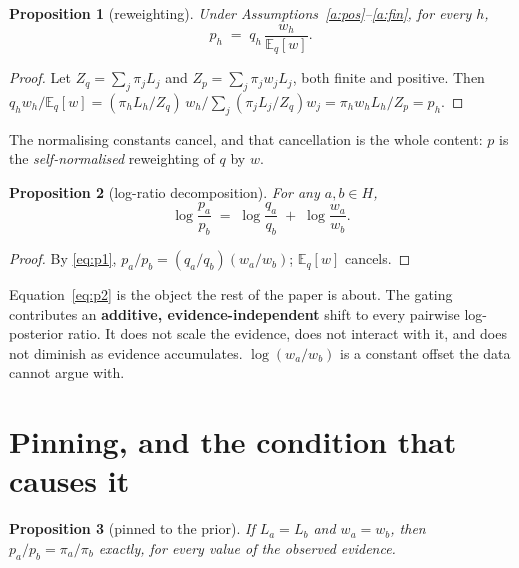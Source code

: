 \documentclass[11pt,a4paper]{article}
\newtheorem{proposition}{Proposition}
\theoremstyle{definition}
\begin{document}
\begin{proposition}[reweighting]\label{p:reweight}
Under Assumptions~\ref{a:pos}--\ref{a:fin}, for every $h$,
\begin{equation}
p_h \;=\; q_h\,\frac{w_h}{\mathbb{E}_q[w]} .
\label{eq:p1}
\end{equation}
\end{proposition}

\begin{proof}
Let $Z_q=\sum_j \pi_j L_j$ and $Z_p=\sum_j \pi_j w_j L_j$, both finite and
positive. Then
$q_h w_h/\mathbb{E}_q[w]
= (\pi_h L_h/Z_q)\,w_h \big/ \sum_j (\pi_j L_j / Z_q) w_j
= \pi_h w_h L_h / Z_p = p_h$.
\end{proof}

The normalising constants cancel, and that cancellation is the whole content:
$p$ is the \emph{self-normalised} reweighting of $q$ by $w$.

\begin{proposition}[log-ratio decomposition]\label{p:logratio}
For any $a,b\in H$,
\begin{equation}
\log\frac{p_a}{p_b}
\;=\;
\log\frac{q_a}{q_b}
\;+\;
\log\frac{w_a}{w_b} .
\label{eq:p2}
\end{equation}
\end{proposition}

\begin{proof}
By \eqref{eq:p1}, $p_a/p_b=(q_a/q_b)(w_a/w_b)$; $\mathbb{E}_q[w]$ cancels.
\end{proof}

Equation~\eqref{eq:p2} is the object the rest of the paper is about. The
gating contributes an \textbf{additive, evidence-independent} shift to every
pairwise log-posterior ratio. It does not scale the evidence, does not
interact with it, and does not diminish as evidence accumulates.
$\log(w_a/w_b)$ is a constant offset the data cannot argue with.

\section{Pinning, and the condition that causes it}
\label{sec:pinning}

\begin{proposition}[pinned to the prior]\label{p:pin}
If $L_a=L_b$ and $w_a=w_b$, then $p_a/p_b=\pi_a/\pi_b$ exactly, for every
value of the observed evidence.
\end{proposition}
\end{document}
